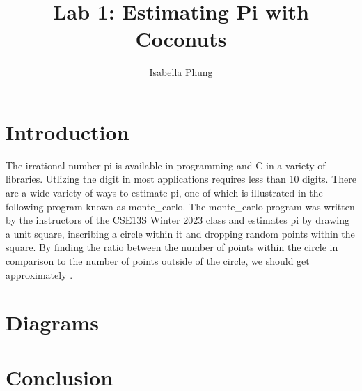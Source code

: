 \documentclass{article}
\title{Lab 1: Estimating Pi with Coconuts}
\author{Isabella Phung}
\begin{document}
\maketitle

\section{Introduction}

The irrational number pi is available in programming and C in a variety of libraries. Utlizing the digit in most applications requires less than 10 digits. There are a wide variety of ways to estimate pi, one of which is illustrated in the following program known as monte_carlo.
The monte_carlo program was written by the instructors of the CSE13S Winter 2023 class and estimates pi by drawing a unit square, inscribing a circle within it and dropping random points within the square. By finding the ratio between the number of points within the circle in comparison to the number of points outside of the circle, we should get approximately .

\section{Diagrams}


\section{Conclusion}
\end{document}
